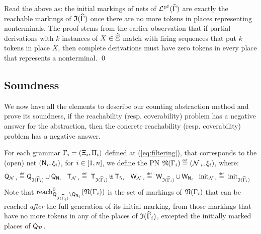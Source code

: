 \begin{proofSketch}
  Read the above as: the initial markings of nets of $\mathcal{L}_{}^{\scriptscriptstyle{{\mathcal{B}}^\sharp}}({\widehat{\Gamma}})$
  are exactly the reachable markings of $\mathfrak{I}({\widehat{\Gamma}})$ once there are no
  more tokens in places representing nonterminals.
  The proof stems from the earlier observation that if partial derivations with
  $k$ instances of $X \in \widehat{\Xi}$ match with firing sequences
  that put $k$ tokens in place $X$,
  then complete derivations must have zero tokens in every place that represents
  a nonterminal.
  \qed
\end{proofSketch}

\subsection{Soundness}

We now have all the elements to describe our counting abstraction
method and prove its soundness, \ie if the reachability
(resp. coverability) problem has a negative answer for the
abstraction, then the concrete reachability (resp. coverability)
problem has a negative answer. 

For each grammar $\Gamma_i=(\Xi_i,\Pi_i)$ defined at
(\autoref{eq:filtering}), that corresponds to the (open) net
$(\mathsf{N}_i,\xi_i)$, for $i\in{[{1},{n}]}$, we define the PN
$\mathfrak{N}({\Gamma_i}) \stackrel{\scriptscriptstyle{\mathsf{def}}}{=} (\mathcal{N}_{~i}, \xi_i)$, where:
\begin{align*}
  \mathsf{Q}_{\mathcal{N}_{~i}} \stackrel{\scriptscriptstyle{\mathsf{def}}}{=} & ~\mathsf{Q}_{\mathfrak{I}({\widehat{\Gamma}_i})} \cup \mathsf{Q}_{\mathsf{N}_i} \hspace*{3mm}
  \mathsf{T}_{\mathcal{N}_{~i}} \stackrel{\scriptscriptstyle{\mathsf{def}}}{=} ~\mathsf{T}_{\mathfrak{I}({\widehat{\Gamma}_i})} \uplus \mathsf{T}_{\mathsf{N}_i} \hspace*{3mm}
  \mathsf{W}_{\mathcal{N}_{~i}} \stackrel{\scriptscriptstyle{\mathsf{def}}}{=} ~\mathsf{W}_{\mathfrak{I}({\widehat{\Gamma}_i})} \cup \mathsf{W}_{\mathsf{N}_i} \hspace*{3mm}
  \mathrm{init}_{\mathcal{N}_{~i}} \stackrel{\scriptscriptstyle{\mathsf{def}}}{=} ~\mathrm{init}_{\mathfrak{I}({\widehat{\Gamma}_i})}
\end{align*}
Note that $\mathrm{reach}^0_{\mathsf{Q}_{\mathfrak{I}({\widehat{\Gamma}_i})} \setminus
  \mathsf{Q}_{\mathsf{N}_i}}({\mathfrak{N}({\Gamma_i})})$ is the set of markings of
$\mathfrak{N}({\Gamma_i})$ that can be reached \emph{after} the full
generation of its initial marking, \ie from those markings that have
no more tokens in any of the places of
$\mathfrak{I}({\widehat{\Gamma}_i})$, excepted the initially marked places
of $\mathsf{Q}_{\mathcal{P}}$.

